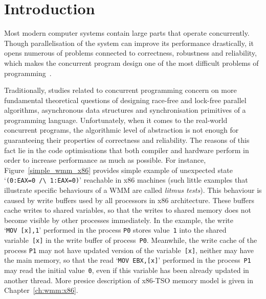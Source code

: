 
\chapter{Introduction}
\label{ch:intro}

Most modern computer systems contain large parts that operate concurrently. Though parallelisation of the system can improve its performance drastically, it opens numerous of problems connected to correctness, robustness and reliability, which makes the concurrent program design one of the most difficult problems of programming~\cite{mckenney2017parallel}.

Traditionally, studies related to concurrent programming concern on more fundamental theoretical questions of designing race-free and lock-free parallel algorithms, asynchronous data structures and synchronisation primitives of a programming language. Unfortunately,
when it comes to 
the real-world concurrent programs, the algorithmic level of abstraction is not enough for guaranteeing their properties of correctness and reliability. The reasons of this fact lie in the code optimisations that both compiler and hardware perform in order to increase performance as much as possible. For instance, Figure~\ref{simple_wmm_x86} provides simple example of
unexpected state `\texttt{(0:EAX=0~/\textbackslash~1:EAX=0)}' reachable in x86 machines (such little examples that illustrate specific behaviours of a WMM are called \textit{litmus tests}).
This behaviour is caused by write buffers used by all processors in x86 architecture. These buffers cache writes to shared variables, so that the writes to shared memory does not become visible by other processes immediately. In the example, the write `\texttt{MOV~[x],1}' performed in the process \texttt{P0} stores value~\texttt{1} into the shared variable~\texttt{[x]} in the write buffer of process~\texttt{P0}. Meanwhile, the write cache of the process \texttt{P1} may not have updated version of the variable~\texttt{[x]}, neither may have the main memory, so that the read `\texttt{MOV~EBX,[x]}' performed in the process~\texttt{P1} may read the initial value~\texttt{0}, even if this variable has been already updated in another thread. More presice description of x86-TSO memory model is given in Chapter~\ref{ch:wmm:x86}.

